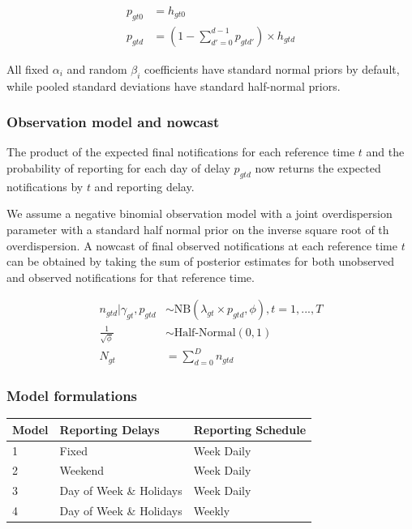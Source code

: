 \documentclass[
  a4paper,
]{article}
\begin{document}
\[
\begin{aligned}
p_{gt0} &= h_{gt0} \\
p_{gtd} &= \left(1 - \sum_{d'=0}^{d-1} p_{gtd'}\right)\times h_{gtd}
\end{aligned}
\]

All fixed \(\alpha_i\) and random \(\beta_i\) coefficients have standard
normal priors by default, while pooled standard deviations have standard
half-normal priors.

\hypertarget{observation-model-and-nowcast}{%
\subsubsection{Observation model and
nowcast}\label{observation-model-and-nowcast}}

The product of the expected final notifications for each reference time
\(t\) and the probability of reporting for each day of delay \(p_{gtd}\)
now returns the expected notifications by \(t\) and reporting delay.

We assume a negative binomial observation model with a joint
overdispersion parameter with a standard half normal prior on the
inverse square root of th overdispersion. A nowcast of final observed
notifications at each reference time \(t\) can be obtained by taking the
sum of posterior estimates for both unobserved and observed
notifications for that reference time.

\[
\begin{aligned}
n_{gtd} | \gamma_{gt}, p_{gtd} &\sim \text{NB}(\lambda_{gt}\times p_{gtd}, \phi), t=1,...,T\\
\frac{1}{\sqrt{\phi}} &\sim \text{Half-Normal}(0,1) \\
N_{gt} &= \sum_{d=0}^D n_{gtd}
\end{aligned}
\]

\hypertarget{model-formulations}{%
\subsubsection{Model formulations}\label{model-formulations}}

\begin{longtable}[]{@{}lll@{}}
\toprule()
Model & Reporting Delays & Reporting Schedule \\
\midrule()
\endhead
1 & Fixed & Week Daily \\
2 & Weekend & Week Daily \\
3 & Day of Week \& Holidays & Week Daily \\
4 & Day of Week \& Holidays & Weekly \\
\bottomrule()
\end{longtable}
\end{document}
